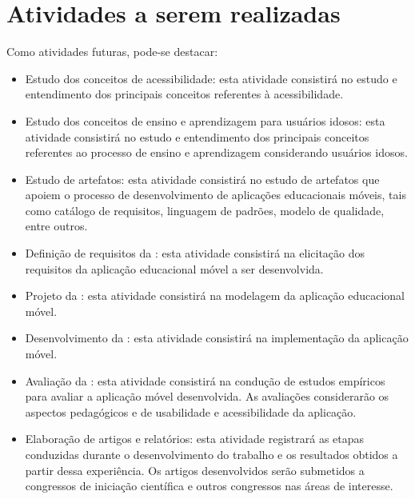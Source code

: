 \chapter{Atividades a serem realizadas} \label{sec:atividades_futuras}
Como atividades futuras, pode-se destacar:
\begin{itemize}
    \item Estudo dos conceitos de acessibilidade: esta atividade consistirá no estudo e entendimento dos principais conceitos referentes à acessibilidade.
    \item Estudo dos conceitos de ensino e aprendizagem para usuários idosos: esta atividade consistirá no estudo e entendimento dos principais conceitos referentes ao processo de ensino e aprendizagem considerando usuários idosos.
    \item Estudo de artefatos: esta atividade consistirá no estudo de artefatos que apoiem o processo de desenvolvimento de aplicações educacionais móveis, tais como catálogo de requisitos, linguagem de padrões, modelo de qualidade, entre outros.
    \item Definição de requisitos da \crossword: esta atividade consistirá na elicitação dos requisitos da aplicação educacional móvel a ser desenvolvida.
    \item Projeto da \crossword: esta atividade consistirá na modelagem da aplicação educacional móvel.
    \item Desenvolvimento da \crossword: esta atividade consistirá na implementação da aplicação móvel.
    \item Avaliação da \crossword: esta atividade consistirá na condução de estudos empíricos para avaliar a aplicação móvel desenvolvida. As avaliações considerarão os aspectos pedagógicos e de usabilidade e acessibilidade da aplicação.
    \item Elaboração de artigos e relatórios: esta atividade registrará as etapas conduzidas durante o desenvolvimento do trabalho e os resultados obtidos a partir dessa experiência. Os artigos desenvolvidos serão submetidos a congressos de iniciação científica e outros congressos nas áreas de interesse.
\end{itemize}